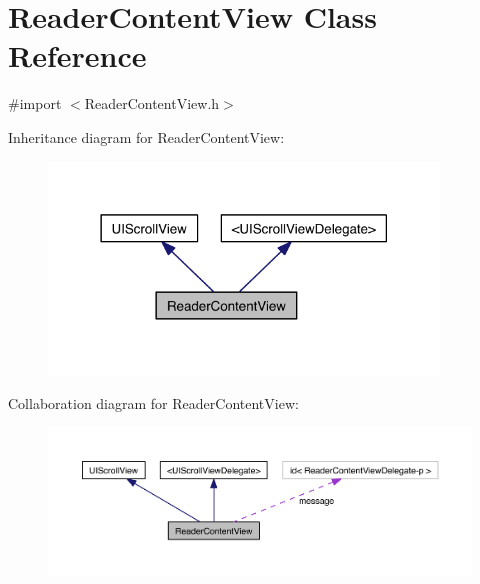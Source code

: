 \hypertarget{interface_reader_content_view}{\section{Reader\-Content\-View Class Reference}
\label{dd/de3/interface_reader_content_view}
}


{\ttfamily \#import $<$Reader\-Content\-View.\-h$>$}



Inheritance diagram for Reader\-Content\-View\-:
\nopagebreak
\begin{figure}[H]
\begin{center}
\leavevmode
\includegraphics[width=294pt]{d2/d5f/interface_reader_content_view__inherit__graph}
\end{center}
\end{figure}


Collaboration diagram for Reader\-Content\-View\-:
\nopagebreak
\begin{figure}[H]
\begin{center}
\leavevmode
\includegraphics[width=350pt]{d6/d7f/interface_reader_content_view__coll__graph}
\end{center}
\end{figure}
